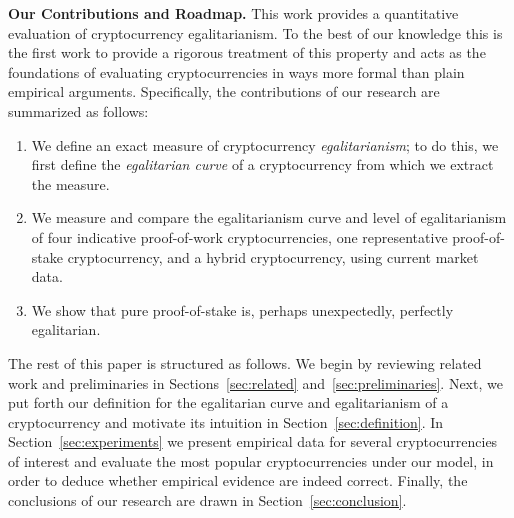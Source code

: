 \noindent
\textbf{Our Contributions and Roadmap.}
This work provides a quantitative evaluation of cryptocurrency egalitarianism.
To the best of our knowledge this is the first work to provide a rigorous
treatment of this property and acts as the foundations of evaluating
cryptocurrencies in ways more formal than plain empirical arguments.
Specifically, the contributions of our research are summarized as follows:

\begin{enumerate}
  \item We define an exact measure of cryptocurrency
        \emph{egalitarianism}; to do this, we first define the \emph{egalitarian curve} of a
        cryptocurrency from which we extract the measure.
  \item We measure and compare the egalitarianism curve and level of egalitarianism of
        four indicative proof-of-work cryptocurrencies, one representative
        proof-of-stake cryptocurrency, and a hybrid cryptocurrency, using
        current market data.
  \item We show that pure proof-of-stake is, perhaps unexpectedly, perfectly
        egalitarian.
\end{enumerate}

The rest of this paper is structured as follows. We begin by reviewing related
work and preliminaries in Sections~\ref{sec:related}
and~\ref{sec:preliminaries}. Next, we put forth our definition for the
egalitarian curve and egalitarianism of a cryptocurrency and motivate its
intuition in Section~\ref{sec:definition}. In Section~\ref{sec:experiments} we
present empirical data for several cryptocurrencies of interest and evaluate
the most popular cryptocurrencies under our model, in order to deduce whether
empirical evidence are indeed correct. Finally, the conclusions of our research
are drawn in Section~\ref{sec:conclusion}.
